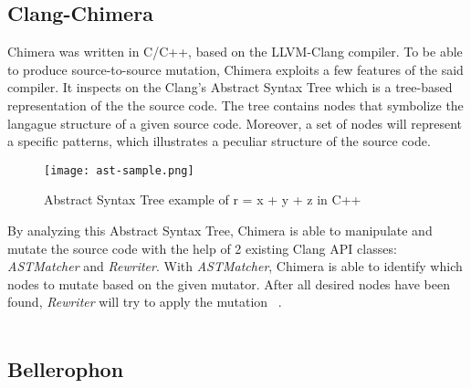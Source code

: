 \subsection{Clang-Chimera}

Chimera was written in C/C++, based on the LLVM-Clang compiler. To be able to produce source-to-source mutation, Chimera exploits a few features of the said compiler. It inspects on the Clang's Abstract Syntax Tree which is a tree-based representation of the the source code. The tree contains nodes that symbolize the langague structure of a given source code. Moreover, a set of nodes will represent a specific patterns, which illustrates a peculiar structure of the source code. \\

\begin{figure}[H]
\texttt{[image: ast-sample.png]}
\centering
\caption{Abstract Syntax Tree example of r = x + y + z in C++}
\end{figure}

By analyzing this Abstract Syntax Tree, Chimera is able to manipulate and mutate the source code with the help of 2 existing Clang API classes: \textit{ASTMatcher} and \textit{Rewriter}. With \textit{ASTMatcher}, Chimera is able to identify which nodes to mutate based on the given mutator. After all desired nodes have been found, \textit{Rewriter} will try to apply the mutation ~\cite{iideaa}. \\
~\\

\subsection{Bellerophon}


